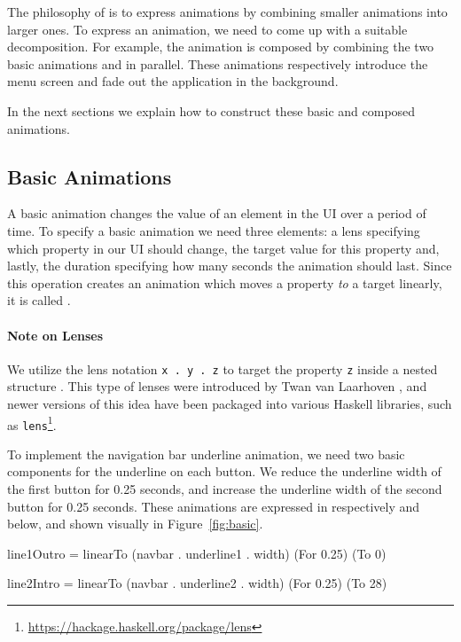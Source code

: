 The philosophy of \dsl{} is to express animations by combining smaller animations into larger ones. To express an animation, we need to come up with a suitable decomposition. For example, the  animation is composed by combining the two basic animations  and  in parallel. These animations respectively introduce the menu screen and fade out the application in the background.

In the next sections we explain how to construct these basic and composed animations.

\subsection{Basic Animations}

A basic animation changes the value of an element in the UI over a period of time. To specify a basic animation we need three elements: a lens specifying which property in our UI should change, the target value for this property and, lastly, the duration specifying how many seconds the animation should last. Since this operation creates an animation which moves a property \emph{to} a target linearly, it is called .

\paragraph{Note on Lenses} We utilize the lens notation \texttt{x . y . z} to target the property \texttt{z} inside a nested structure . This type of lenses were introduced by Twan van Laarhoven \cite{vlLenses}, and newer versions of this idea have been packaged into various Haskell libraries, such as \texttt{lens}\footnote{\url{https://hackage.haskell.org/package/lens}}.

To implement the navigation bar underline animation, we need two basic components for the underline on each button. We reduce the underline width of the first button for 0.25 seconds, and increase the underline width of the second button for 0.25 seconds. These animations are expressed in respectively  and  below, and shown visually in Figure~\ref{fig:basic}.

\begin{spec}
line1Outro = linearTo (navbar . underline1 . width) (For 0.25) (To 0)

line2Intro = linearTo (navbar . underline2 . width) (For 0.25) (To 28)
\end{spec}

